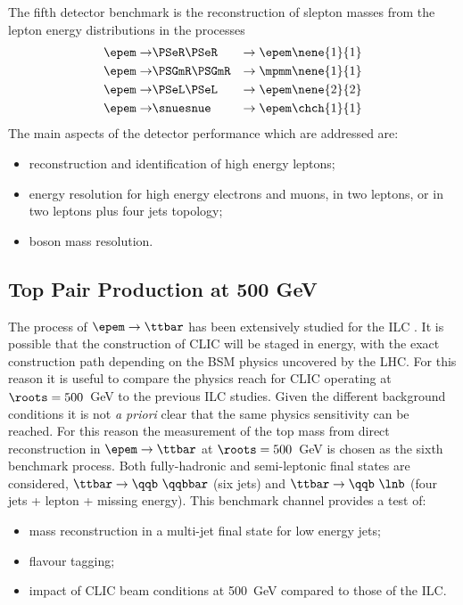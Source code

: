 The fifth detector benchmark is the reconstruction of slepton masses from the
lepton energy distributions in the processes
\begin{eqnarray*}
\epem\to &\PSeR\PSeR    & \to \epem \nene{1}{1}\\
\epem\to &\PSGmR\PSGmR  & \to \mpmm \nene{1}{1}\\
\epem\to &\PSeL\PSeL    & \to \epem \nene{2}{2}\\
\epem\to &\snuesnue   & \to \epem \chch{1}{1}
\end{eqnarray*}
The main aspects of the detector performance which are addressed are:
\begin{itemize}
   \item reconstruction and identification of high energy leptons;
   \item energy resolution for high energy electrons and muons, in two
   leptons, or in two leptons plus four jets topology;
   \item boson mass resolution.
\end{itemize}


\subsection{Top Pair Production at 500 GeV}\label{sec:chap3:toppair}

The process of $\epem\rightarrow \ttbar$ has been extensively studied for the
ILC \cite{TeslaTDRPart3, ildloi:2009, Aihara:2009ad}. It is possible that 
the construction of CLIC will be staged in energy, with the exact construction path 
depending on the \acs{BSM} physics uncovered by the \acs{LHC}. For this reason it is useful to compare 
the physics reach for CLIC operating at $\roots=500$~GeV to the previous ILC studies. Given 
the different background conditions it is not \textit{a priori} clear that the same physics 
sensitivity can be reached. For this reason the measurement of the top mass from direct 
reconstruction in $\epem\rightarrow\ttbar$ at $\roots = 500$~GeV is chosen as the sixth 
benchmark process. Both fully-hadronic and semi-leptonic final states are considered, 
 ${\ttbar\rightarrow \qqb~\qqbbar}$ (six jets) and 
${\ttbar\rightarrow \qqb~\lnb}$ (four jets + lepton + missing energy).
This benchmark channel provides a test of:
\begin{itemize}
   \item mass reconstruction in a multi-jet final state for low energy jets;
   \item flavour tagging;
   \item impact of CLIC beam conditions at 500~GeV compared to those of the
   \acs{ILC}.
\end{itemize}



